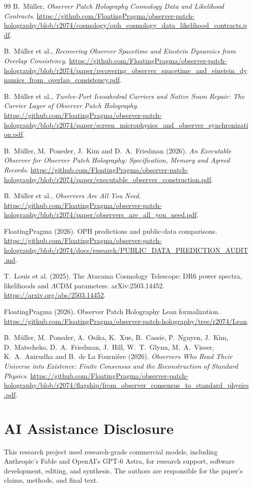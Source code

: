 \documentclass[11pt]{article}
\theoremstyle{remark}
\begin{document}
\begin{thebibliography}{99}
\setlength{\itemsep}{2pt}
\setlength{\parskip}{0pt}
B.~M\"uller, \emph{Observer Patch Holography Cosmology Data and Likelihood Contracts}.
\url{https://github.com/FloatingPragma/observer-patch-holography/blob/r2074/cosmology/oph_cosmology_data_likelihood_contracts.pdf}.

B.~M\"uller et al.,
\emph{Recovering Observer Spacetime and Einstein Dynamics from Overlap Consistency}.
\url{https://github.com/FloatingPragma/observer-patch-holography/blob/r2074/paper/recovering_observer_spacetime_and_einstein_dynamics_from_overlap_consistency.pdf}.

B.~M\"uller et al.,
\emph{Twelve-Port Icosahedral Carriers and Native Seam Repair: The Carrier Layer of Observer Patch Holography}.
\url{https://github.com/FloatingPragma/observer-patch-holography/blob/r2074/paper/screen_microphysics_and_observer_synchronization.pdf}.

B.~M\"uller, M.~Poneder, J.~Kim and D.~A.~Friedman (2026). \emph{An Executable
Observer for Observer Patch Holography: Specification, Memory and Agreed
Records}.
\url{https://github.com/FloatingPragma/observer-patch-holography/blob/r2074/paper/executable_observer_construction.pdf}.

B.~M\"uller et al., \emph{Observers Are All You Need}.
\url{https://github.com/FloatingPragma/observer-patch-holography/blob/r2074/paper/observers_are_all_you_need.pdf}.

FloatingPragma (2026). OPH predictions and public-data comparisons.
\url{https://github.com/FloatingPragma/observer-patch-holography/blob/r2074/docs/research/PUBLIC_DATA_PREDICTION_AUDIT.md}.

T.~Louis et al. (2025). The Atacama Cosmology Telescope: DR6 power spectra,
likelihoods and \(\Lambda\)CDM parameters. arXiv:2503.14452.
\url{https://arxiv.org/abs/2503.14452}.

FloatingPragma (2026). Observer Patch Holography Lean formalization.
\url{https://github.com/FloatingPragma/observer-patch-holography/tree/r2074/Lean}.

B.~M\"uller, M.~Poneder, A.~Osika, K.~Xue, B.~Cassie, P.~Nguyen, J.~Kim,
D.~Matscheko, D.~A.~Friedman, J.~Hill, W.~T.~Glynn, M.~A.~Visser,
K.~A.~Anirudha and B.~de La Fourni\`ere (2026). \emph{Observers Who Read Their
Universe into Existence: Finite Consensus and the Reconstruction of Standard
Physics}.
\url{https://github.com/FloatingPragma/observer-patch-holography/blob/r2074/flagship/from_observer_consensus_to_standard_physics.pdf}.

\end{thebibliography}

\section*{AI Assistance Disclosure}
This research project used research-grade commercial models, including
Anthropic's Fable and OpenAI's GPT-6 Astra, for research support, software
development, editing, and synthesis. The authors are responsible for the
paper's claims, methods, and final text.
\end{document}
